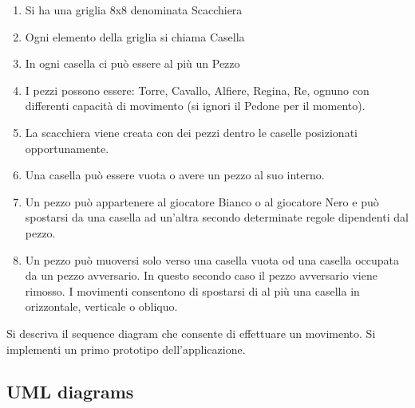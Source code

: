 \documentclass{article}
\begin{document}
\begin{enumerate}
\item Si ha una griglia 8x8 denominata Scacchiera 

\item Ogni elemento della griglia si chiama Casella 

\item In ogni casella ci pu\`o essere al pi\`u un Pezzo 

\item I pezzi possono essere: Torre, Cavallo, Alfiere, Regina, Re, ognuno con differenti 
capacit\`a di movimento (si ignori il Pedone per il momento). 

\item La scacchiera viene creata con dei pezzi dentro le caselle posizionati 
opportunamente. 

\item Una casella pu\`o essere vuota o avere un pezzo al suo interno. 

\item Un pezzo pu\`o appartenere al giocatore Bianco o al giocatore Nero e pu\`o spostarsi 
da una casella ad un’altra secondo determinate regole dipendenti dal pezzo. 

\item Un pezzo pu\`o muoversi solo verso una casella vuota od una casella occupata da 
un pezzo avversario. In questo secondo caso il pezzo avversario viene rimosso. I movimenti consentono di spostarsi di al pi\`u una casella in orizzontale, verticale o obliquo.
\end{enumerate}

Si descriva il sequence diagram che consente di effettuare un movimento.
Si implementi un primo prototipo dell'applicazione.

\subsection{UML diagrams}
\end{document}
